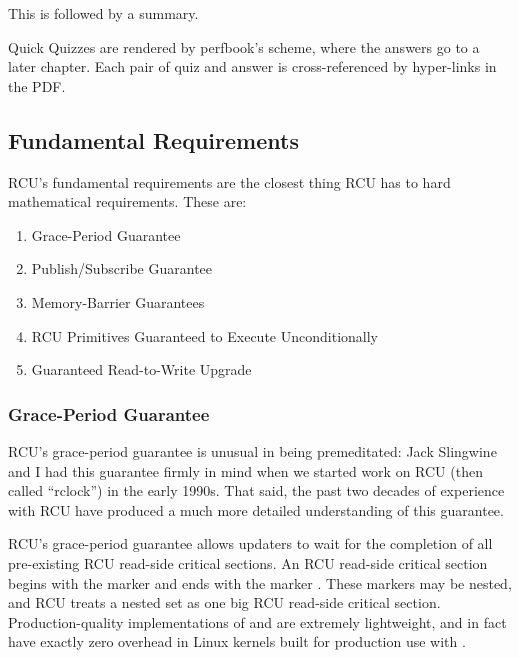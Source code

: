 This is followed by a summary.


\begin{Note}
  Quick Quizzes are rendered by perfbook's scheme, where the answers
  go to a later chapter.
  Each pair of quiz and answer is cross-referenced by hyper-links in
  the PDF\@.
\end{Note}

\subsection{Fundamental Requirements}

RCU's fundamental requirements are the closest thing RCU has to hard
mathematical requirements.
These are:

\begin{enumerate}
\item Grace-Period Guarantee
\item Publish/Subscribe Guarantee
\item Memory-Barrier Guarantees
\item RCU Primitives Guaranteed to Execute Unconditionally
\item Guaranteed Read-to-Write Upgrade
\end{enumerate}

\subsubsection{Grace-Period Guarantee}

RCU's grace-period guarantee is unusual in being premeditated:
Jack
Slingwine and I had this guarantee firmly in mind when we started work
on RCU (then called “rclock”) in the early 1990s.
That said, the past
two decades of experience with RCU have produced a much more detailed
understanding of this guarantee.

RCU's grace-period guarantee allows updaters to wait for the completion
of all pre-existing RCU read-side critical sections.
An RCU read-side
critical section begins with the marker  and ends
with the marker .
These markers may be nested, and
RCU treats a nested set as one big RCU read-side critical section.
Production-quality implementations of  and
 are extremely lightweight, and in fact have
exactly zero overhead in Linux kernels built for production use with
.

